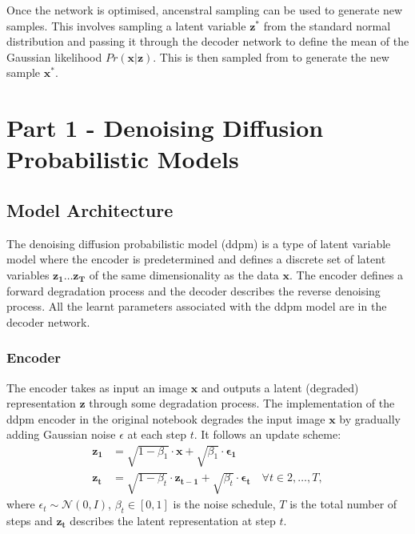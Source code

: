 \documentclass[11pt]{article}
\begin{document}
Once the network is optimised, ancenstral sampling can be used to generate new samples. This involves sampling a latent variable $\mathbf{z^*}$ from the standard normal distribution and passing it through the decoder network to define the mean of the Gaussian likelihood $Pr(\mathbf{x}|\mathbf{z})$. This is then sampled from to generate the new sample $\mathbf{x^*}$.

\section{Part 1 - Denoising Diffusion Probabilistic Models}
\subsection{Model Architecture}
The denoising diffusion probabilistic model (ddpm) is a type of latent variable model where the encoder is predetermined and defines a discrete set of latent variables $\mathbf{z_1} \ldots \mathbf{z_T}$ of the same dimensionality as the data $\mathbf{x}$. The encoder defines a forward degradation process and the decoder describes the reverse denoising process. All the learnt parameters associated with the ddpm model are in the decoder network.

\subsubsection{Encoder}
The encoder takes as input an image $\mathbf{x}$ and outputs a latent (degraded) representation $\mathbf{z}$ through some degradation process. The implementation of the ddpm encoder in the original notebook degrades the input image $\mathbf{x}$ by gradually adding Gaussian noise $\epsilon$ at each step $t$. It follows an update scheme:
\begin{equation}
    \begin{aligned}
        \mathbf{z_1} &= \sqrt{1-\beta_1} \cdot \mathbf{x} + \sqrt{\beta_1} \cdot \boldsymbol{\epsilon_1} \\
        \mathbf{z_t} &= \sqrt{1-\beta_t} \cdot \mathbf{z_{t-1}} + \sqrt{\beta_t} \cdot \boldsymbol{\epsilon_t} \quad \forall t \in 2, \ldots, T,
    \end{aligned}
    \label{eq:z_t_beta_gauss_noise}
\end{equation}
where $\epsilon_t \sim \mathcal{N}(0, I)$, $\beta_t \in [0,1]$ is the noise schedule, $T$ is the total number of steps and $\mathbf{z_t}$ describes the latent representation at step $t$.
\end{document}
